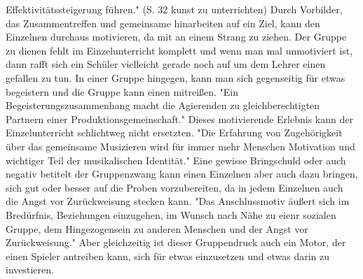 Effektivitätssteigerung führen." (S. 32 kunst zu unterrichten) Durch Vorbilder,
das Zusammentreffen und gemeinsame hinarbeiten auf ein Ziel, kann den Einzelnen
durchaus motivieren, da mit an einem Strang zu ziehen. Der Gruppe zu dienen
fehlt im Einzelunterricht komplett und wenn man mal unmotiviert ist, dann rafft
sich ein Schüler vielleicht gerade noch auf um dem Lehrer einen gefallen zu tun.
In einer Gruppe hingegen, kann man sich gegenseitig für etwas begeistern und die
Gruppe kann einen mitreißen. "Ein Begeisterungszusammenhang macht die Agierenden zu gleichberechtigten
Partnern einer Produktionsgemeinschaft." \autocite[198]{busch:grundwissen_instrumentalpaedagogik}
Dieses motivierende Erlebnis kann der Einzelunterricht schlichtweg nicht
ersetzten. "Die Erfahrung von Zugehörigkeit über das gemeinsame Musizieren wird für immer
mehr Menschen Motivation und wichtiger Teil der musikalischen
Identität." \autocite[123]{mitzscherlich:musikpsychologie} 
Eine gewisse Bringschuld oder auch negativ betitelt der Gruppenzwang kann einen
Einzelnen aber auch dazu bringen, sich gut oder besser auf die Proben
vorzubereiten, da in jedem Einzelnen auch die Angst vor Zurückweisung stecken
kann. "Das Anschlussmotiv äußert sich im Bredürfnis, Beziehungen
einzugehen,
im Wunsch
nach Nähe zu eienr sozialen Gruppe, dem Hingezogensein zu anderen Menschen und
der Angst vor Zurückweisung." \autocite[120ff]{losert:die_kunst_zu_unterrichten}
Aber gleichzeitig ist dieser Gruppendruck auch ein Motor, der einen Spieler
antreiben kann, sich für etwas einzusetzen und etwas darin zu investieren.










